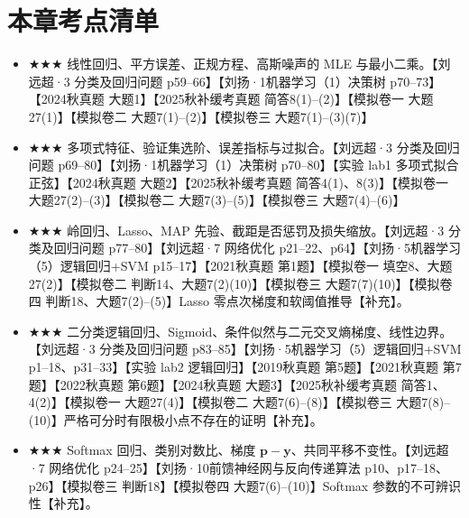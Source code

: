 \documentclass[UTF8,a4paper,zihao=-4,fontset=fandol]{ctexrep}
\begin{document}
\section{本章考点清单}
\begin{itemize}[leftmargin=2em]
\item \(\bigstar \bigstar \bigstar\) 线性回归、平方误差、正规方程、高斯噪声的 MLE 与最小二乘。【刘远超·3 分类及回归问题 p59--66】【刘扬·1机器学习（1）决策树 p70--73】【2024秋真题 大题1】【2025秋补缓考真题 简答8(1)--(2)】【模拟卷一 大题27(1)】【模拟卷二 大题7(1)--(2)】【模拟卷三 大题7(1)--(3)(7)】
\item \(\bigstar \bigstar \bigstar\) 多项式特征、验证集选阶、误差指标与过拟合。【刘远超·3 分类及回归问题 p69--80】【刘扬·1机器学习（1）决策树 p70--80】【实验 lab1 多项式拟合正弦】【2024秋真题 大题2】【2025秋补缓考真题 简答4(1)、8(3)】【模拟卷一 大题27(2)--(3)】【模拟卷二 大题7(3)--(5)】【模拟卷三 大题7(4)--(6)】
\item \(\bigstar \bigstar \bigstar\) 岭回归、Lasso、MAP 先验、截距是否惩罚及损失缩放。【刘远超·3 分类及回归问题 p77--80】【刘远超·7 网络优化 p21--22、p64】【刘扬·5机器学习（5）逻辑回归+SVM p15--17】【2021秋真题 第1题】【模拟卷一 填空8、大题27(2)】【模拟卷二 判断14、大题7(2)(10)】【模拟卷三 大题7(7)(10)】【模拟卷四 判断18、大题7(2)--(5)】Lasso 零点次梯度和软阈值推导【补充】。
\item \(\bigstar \bigstar \bigstar\) 二分类逻辑回归、Sigmoid、条件似然与二元交叉熵梯度、线性边界。【刘远超·3 分类及回归问题 p83--85】【刘扬·5机器学习（5）逻辑回归+SVM p1--18、p31--33】【实验 lab2 逻辑回归】【2019秋真题 第5题】【2021秋真题 第7题】【2022秋真题 第6题】【2024秋真题 大题3】【2025秋补缓考真题 简答1、4(2)】【模拟卷一 大题27(4)】【模拟卷二 大题7(6)--(8)】【模拟卷三 大题7(8)--(10)】严格可分时有限极小点不存在的证明【补充】。
\item \(\bigstar \bigstar \bigstar\) Softmax 回归、类别对数比、梯度 \(\bm p-\bm y\)、共同平移不变性。【刘远超·7 网络优化 p24--25】【刘扬·10前馈神经网与反向传递算法 p10、p17--18、p26】【模拟卷三 判断18】【模拟卷四 大题7(6)--(10)】Softmax 参数的不可辨识性【补充】。
\end{itemize}
\end{document}
